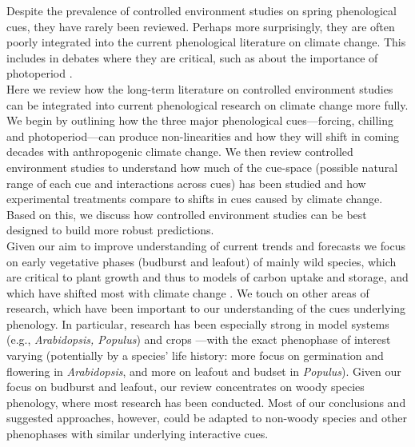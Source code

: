 \documentclass[11pt,letter]{article}
\begin{document}
Despite the prevalence of controlled environment studies on spring phenological cues, they have rarely been reviewed. Perhaps more surprisingly, they are often poorly integrated into the current phenological literature on climate change. This includes in debates where they are critical, such as about the importance of photoperiod \citep[e.g.,][]{fu2015,richardson2018}.\\

Here we review how the long-term literature on controlled environment studies can be integrated into current phenological research on climate change more fully. We begin by outlining how the three major phenological cues---forcing, chilling and photoperiod---can produce non-linearities and how they will shift in coming decades with anthropogenic climate change. We then review controlled environment studies to understand how much of the cue-space (possible natural range of each cue and interactions across cues) has been studied and how experimental treatments compare to shifts in cues caused by climate change. Based on this, we discuss how controlled environment studies can be best designed to build more robust predictions.\\ 

Given our aim to improve understanding of current trends and forecasts we focus on early vegetative phases (budburst and leafout) of mainly wild species, which are critical to plant growth and thus to models of carbon uptake and storage, and which have shifted most with climate change \citep{Cleland:2007or,IPCC:2014sm}. We touch on other areas of research, which have been important to our understanding of the cues underlying phenology. In particular, research has been especially strong in model systems (e.g., \emph{Arabidopsis, Populus}) and crops \citep{cesaraccio2004}---with the exact phenophase of interest varying (potentially by a species' life history: more focus on germination and flowering in \emph{Arabidopsis}, and more on leafout and budset in \emph{Populus}).  Given our focus on budburst and leafout, our review concentrates on woody species phenology, where most research has been conducted. Most of our conclusions and suggested approaches, however, could be adapted to non-woody species and other phenophases with similar underlying interactive cues. \\
\end{document}
